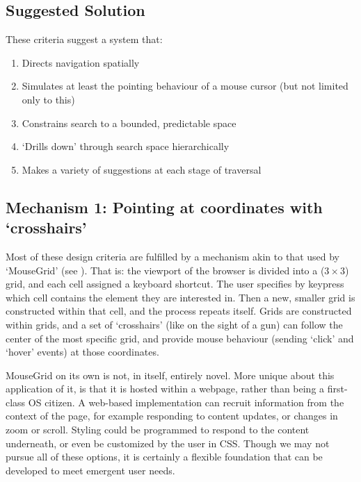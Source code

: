 \documentclass[a4paper, 12pt]{report}
\begin{document}
\subsection{Suggested Solution}
These criteria suggest a system that:

\newcommand{\designcriteria}{\begin{enumerate}
	\item Directs navigation spatially
	\item Simulates at least the pointing behaviour of a mouse cursor (but not limited only to this)
	\item Constrains search to a bounded, predictable space
	\item `Drills down' through search space hierarchically 
	\item Makes a variety of suggestions at each stage of traversal
\end{enumerate}}
\designcriteria

\subsection{Mechanism 1: Pointing at coordinates with `crosshairs'}
\label{sec:ourmousegrid}
Most of these design criteria are fulfilled by a mechanism akin to that used by `MouseGrid' (see ).
That is: the viewport of the browser is divided into a ($3\times3$) grid, and each cell assigned a keyboard shortcut. The user specifies by keypress which cell contains the element they are interested in. Then a new, smaller grid is constructed within that cell, and the process repeats itself.
Grids are constructed within grids, and a set of `crosshairs' (like on the sight of a gun) can follow the center of the most specific grid, and provide mouse behaviour (sending `click' and `hover' events) at those coordinates.

MouseGrid on its own is not, in itself, entirely novel. More unique about this application of it, is that it is hosted within a webpage, rather than being a first-class OS citizen. A web-based implementation can recruit information from the context of the page, for example responding to content updates, or changes in zoom or scroll. Styling could be programmed to respond to the content underneath, or even be customized by the user in CSS. Though we may not pursue all of these options, it is certainly a flexible foundation that can be developed to meet emergent user needs.
\end{document}
